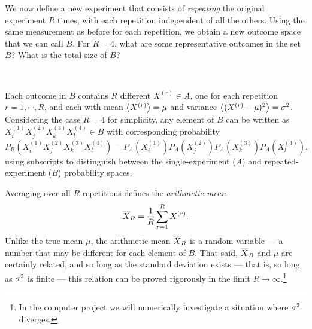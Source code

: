 We now define a new experiment that consists of \textit{repeating} the original experiment $R$ times, with each repetition independent of all the others.
Using the same measurement as before for each repetition, we obtain a new outcome space that we can call $B$.
For $R = 4$, what are some representative outcomes in the set $B$?
What is the total size of $B$?
\begin{mdframed}
  \ \\[100 pt]
\end{mdframed}

Each outcome in $B$ contains $R$ different $X^{(r)} \in A$, one for each repetition $r = 1, \cdots, R$, and each with mean $\left\langle X^{(r)} \right\rangle = \mu$ and variance $\left\langle (X^{(r)} - \mu)^2 \right\rangle = \sigma^2$.
Considering the case $R = 4$ for simplicity, any element of $B$ can be written as $X_i^{(1)} X_j^{(2)} X_k^{(3)} X_l^{(4)} \in B$ with corresponding probability
\begin{equation*}
  P_B\left(X_i^{(1)} X_j^{(2)} X_k^{(3)} X_l^{(4)}\right) = P_A\left(X_i^{(1)}\right) P_A\left(X_j^{(2)}\right) P_A\left(X_k^{(3)}\right) P_A\left(X_l^{(4)}\right),
\end{equation*}
using subscripts to distinguish between the single-experiment ($A$) and repeated-experiment ($B$) probability spaces.

Averaging over all $R$ repetitions defines the \textit{arithmetic mean}
\begin{equation}
  \label{eq:ave}
  \overline X_R = \frac{1}{R} \sum_{r = 1}^R X^{(r)}.
\end{equation}
Unlike the true mean $\mu$, the arithmetic mean $\overline X_R$ is a random variable --- a number that may be different for each element of $B$.
That said, $\overline X_R$ and $\mu$ are certainly related, and so long as the standard deviation exists --- that is, so long as $\sigma^2$ is finite --- this relation can be proved rigorously in the limit $R \to \infty$.\footnote{In the computer project we will numerically investigate a situation where $\sigma^2$ diverges.}

